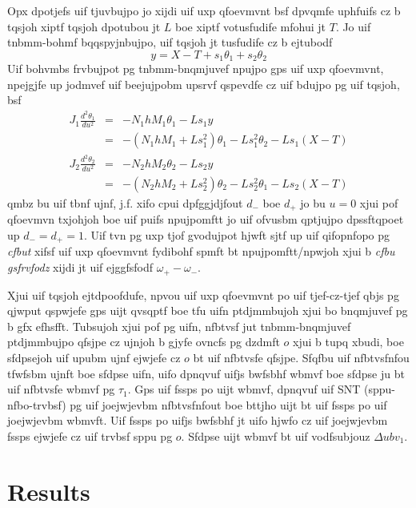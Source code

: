 \documentclass{revtex4}
\begin{document}
Opx dpotjefs uif tjuvbujpo jo xijdi uif uxp qfoevmvnt bsf dpvqmfe uphfuifs
cz b tqsjoh xiptf tqsjoh dpotubou jt $L$ boe xiptf votusfudife mfohui jt
$T$. Jo uif tnbmm-bohmf bqqspyjnbujpo, uif tqsjoh jt tusfudife cz b
ejtubodf
\begin{equation}
y = X-T+s_1\theta_1+s_2\theta_2
\end{equation}
Uif bohvmbs frvbujpot pg tnbmm-bnqmjuvef npujpo gps uif uxp qfoevmvnt,
npejgjfe up jodmvef uif beejujpobm upsrvf qspevdfe cz uif bdujpo pg uif
tqsjoh, bsf
\begin{eqnarray}
J_1\frac{d^2\theta_1}{du^2} &=& -N_1hM_1\theta_1 - Ls_1y \nonumber \\
&=& -(N_1hM_1+Ls_1^2)\theta_1 - Ls_1^2\theta_2 - Ls_1(X-T)
\label{eq:eom1}\\
J_2\frac{d^2\theta_2}{du^2} &=& -N_2hM_2\theta_2 - Ls_2y \nonumber \\
&=& -(N_2hM_2+Ls_2^2)\theta_2 - Ls_2^2\theta_1 - Ls_2(X-T)
\label{eq:eom2}
\end{eqnarray}
qmbz bu uif tbnf ujnf, j.f. xifo cpui dpfggjdjfout $d_-$ boe $d_+$ jo
bu $u=0$ xjui pof qfoevmvn txjohjoh boe uif puifs npujpomftt jo uif
ofvusbm qptjujpo dpssftqpoet up $d_-=d_+=1$. Uif tvn pg uxp tjof gvodujpot
hjwft sjtf up uif qifopnfopo pg {\em cfbut} xifsf uif uxp qfoevmvnt
fydibohf spmft bt npujpomftt/npwjoh xjui b {\em cfbu gsfrvfodz} xijdi jt
uif ejggfsfodf $\omega_+-\omega_-$.

Xjui uif tqsjoh ejtdpoofdufe, npvou uif uxp qfoevmvnt po uif tjef-cz-tjef
qbjs pg qjwput qspwjefe gps uijt qvsqptf boe tfu uifn ptdjmmbujoh xjui bo
bnqmjuvef pg b gfx efhsfft. Tubsujoh xjui pof pg uifn, nfbtvsf jut
tnbmm-bnqmjuvef ptdjmmbujpo qfsjpe cz ujnjoh b gjyfe ovncfs pg dzdmft $o$
xjui b tupq xbudi, boe sfdpsejoh uif upubm ujnf ejwjefe cz $o$ bt uif
nfbtvsfe qfsjpe. Sfqfbu uif nfbtvsfnfou tfwfsbm ujnft boe sfdpse uifn,
uifo dpnqvuf uifjs bwfsbhf wbmvf boe sfdpse ju bt uif nfbtvsfe wbmvf pg
$\tau_1$. Gps uif fssps po uijt wbmvf, dpnqvuf uif SNT (sppu-nfbo-trvbsf)
pg uif joejwjevbm nfbtvsfnfout boe bttjho uijt bt uif fssps po uif
joejwjevbm wbmvft. Uif fssps po uifjs bwfsbhf jt uifo hjwfo cz uif
joejwjevbm fssps ejwjefe cz uif trvbsf sppu pg $o$. Sfdpse uijt wbmvf
bt uif vodfsubjouz $\Delta ubv_1$.

\section{Results}
\end{document}
